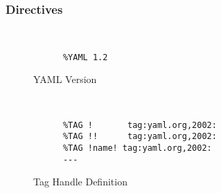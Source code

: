 \documentclass[a4paper, svgnames, 12pt]{article}
\begin{document}
\subsubsection{Directives}

\begin{figure}[H]
  \begin{minipage}[t]{0.48\textwidth}
    \vspace{0pt}
    \begin{bchart}[max=9, width=0.85\textwidth]
    \end{bchart}
  \end{minipage}
  \begin{minipage}[t]{0pt}~\end{minipage}
  \begin{minipage}[t]{0.48\textwidth}
    \vspace{0pt}
    \begin{verbatim}
      %YAML 1.2
    \end{verbatim}
  \end{minipage}
  \caption{YAML Version}
\end{figure}

\begin{figure}[H]
  \begin{minipage}[t]{0.48\textwidth}
    \vspace{0pt}
    \begin{bchart}[max=9, width=0.85\textwidth]
    \end{bchart}
  \end{minipage}
  \begin{minipage}[t]{0pt}~\end{minipage}
  \begin{minipage}[t]{0.48\textwidth}
    \vspace{0pt}
    \begin{verbatim}
      %TAG !       tag:yaml.org,2002:
      %TAG !!      tag:yaml.org,2002:
      %TAG !name! tag:yaml.org,2002:
      ---
    \end{verbatim}
  \end{minipage}
  \caption{Tag Handle Definition}
\end{figure}
\end{document}
